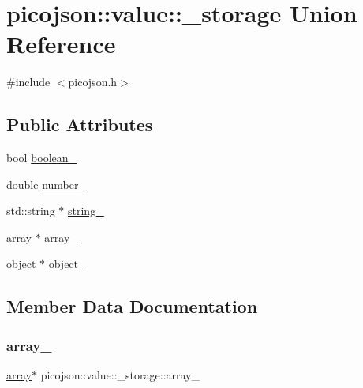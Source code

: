 \hypertarget{unionpicojson_1_1value_1_1__storage}{}\section{picojson\+:\+:value\+:\+:\+\_\+storage Union Reference}
\label{unionpicojson_1_1value_1_1__storage}


{\ttfamily \#include $<$picojson.\+h$>$}

\subsection*{Public Attributes}
\begin{DoxyCompactItemize}
\item 
bool \hyperlink{unionpicojson_1_1value_1_1__storage_a612a1a8ceb65bdd2e8f09eb33074ba0b}{boolean\+\_\+}
\item 
double \hyperlink{unionpicojson_1_1value_1_1__storage_a4fc799f222c28156f943a891e510e438}{number\+\_\+}
\item 
std\+::string $\ast$ \hyperlink{unionpicojson_1_1value_1_1__storage_a9ec5aa5b86bbef81b15697c936f58736}{string\+\_\+}
\item 
\hyperlink{classpicojson_1_1value_adeff4fdf7ee5675eeb7686bb89233c43}{array} $\ast$ \hyperlink{unionpicojson_1_1value_1_1__storage_aeac6ef9328845f1f6402c35bb281990a}{array\+\_\+}
\item 
\hyperlink{classpicojson_1_1value_a7d7da11d54d7b983a902d28367bda9c1}{object} $\ast$ \hyperlink{unionpicojson_1_1value_1_1__storage_ad1feb283e78999609c7a27be95e5f4df}{object\+\_\+}
\end{DoxyCompactItemize}


\subsection{Member Data Documentation}
\hypertarget{unionpicojson_1_1value_1_1__storage_aeac6ef9328845f1f6402c35bb281990a}{}\label{unionpicojson_1_1value_1_1__storage_aeac6ef9328845f1f6402c35bb281990a} 
\subsubsection{\texorpdfstring{array\+\_\+}{array\_}}
{\footnotesize\ttfamily \hyperlink{classpicojson_1_1value_adeff4fdf7ee5675eeb7686bb89233c43}{array}$\ast$ picojson\+::value\+::\+\_\+storage\+::array\+\_\+}

